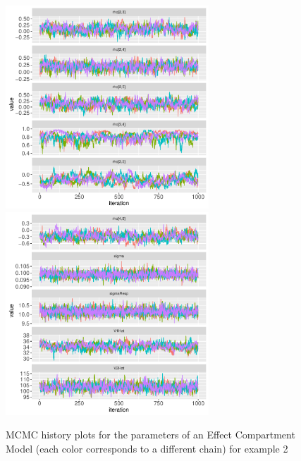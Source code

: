\documentclass[11pt]{amsart}
\begin{document}
\begin{figure}[!htb]
\includegraphics[width=3.0in,trim=0in 0in 0 0in]{graphics/effCptModelTorsten_0.82/effCptPlots004.pdf}
\includegraphics[width=3.0in,trim=0in 0in 0 0in]{graphics/effCptModelTorsten_0.82/effCptPlots005.pdf}
\caption{{MCMC history plots for the parameters of an Effect Compartment Model (each color corresponds to a different chain) for example 2}}
\label{effCptModelMCMC}
\end{figure}
\end{document}

